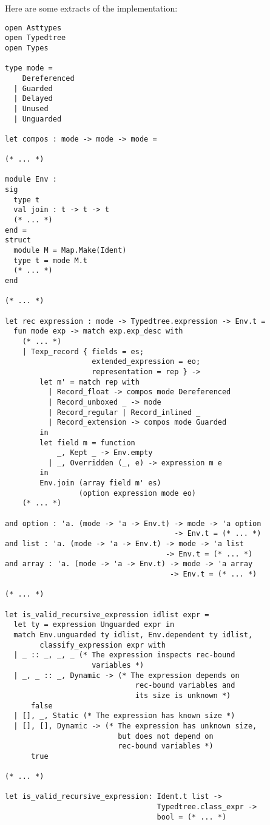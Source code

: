 \documentclass{article}
\begin{document}
Here are some extracts of the implementation:
\begin{lstlisting}
open Asttypes
open Typedtree
open Types

type mode =
    Dereferenced
  | Guarded
  | Delayed
  | Unused
  | Unguarded

let compos : mode -> mode -> mode =

(* ... *)

module Env :
sig
  type t
  val join : t -> t -> t
  (* ... *)
end =
struct
  module M = Map.Make(Ident)
  type t = mode M.t
  (* ... *)
end

(* ... *)

let rec expression : mode -> Typedtree.expression -> Env.t =
  fun mode exp -> match exp.exp_desc with
    (* ... *)
    | Texp_record { fields = es;
                    extended_expression = eo;
                    representation = rep } ->
        let m' = match rep with
          | Record_float -> compos mode Dereferenced
          | Record_unboxed _ -> mode
          | Record_regular | Record_inlined _
          | Record_extension -> compos mode Guarded
        in
        let field m = function
            _, Kept _ -> Env.empty
          | _, Overridden (_, e) -> expression m e
        in
        Env.join (array field m' es)
                 (option expression mode eo)
    (* ... *)

and option : 'a. (mode -> 'a -> Env.t) -> mode -> 'a option
                                       -> Env.t = (* ... *)
and list : 'a. (mode -> 'a -> Env.t) -> mode -> 'a list
                                     -> Env.t = (* ... *)
and array : 'a. (mode -> 'a -> Env.t) -> mode -> 'a array
                                      -> Env.t = (* ... *)

(* ... *)

let is_valid_recursive_expression idlist expr =
  let ty = expression Unguarded expr in
  match Env.unguarded ty idlist, Env.dependent ty idlist,
        classify_expression expr with
  | _ :: _, _, _ (* The expression inspects rec-bound
                    variables *)
  | _, _ :: _, Dynamic -> (* The expression depends on
                              rec-bound variables and
                              its size is unknown *)
      false
  | [], _, Static (* The expression has known size *)
  | [], [], Dynamic -> (* The expression has unknown size,
                          but does not depend on
                          rec-bound variables *)
      true

(* ... *)

let is_valid_recursive_expression: Ident.t list ->
                                   Typedtree.class_expr ->
                                   bool = (* ... *)
\end{lstlisting}
\end{document}
